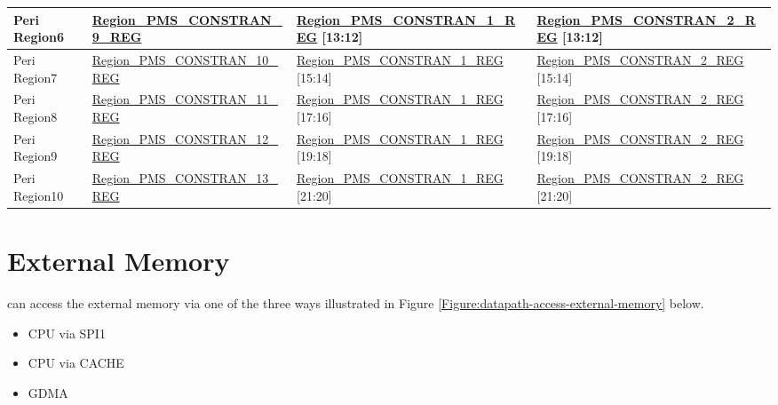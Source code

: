 \documentclass[main\_\_EN.tex]{subfiles}
\begin{document}
\begin{table}[H]
\begin{tabular}{ | l | l | l | l |}
        Peri Region6 & \scriptsize{\hyperref[regdesc:PMSCORE0REGIONPMSCONSTRAIN3REG]{Region\_PMS\_CONSTRAN\_9\_REG}} & \scriptsize{\hyperref[regdesc:PMSCORE0REGIONPMSCONSTRAIN1REG]{Region\_PMS\_CONSTRAN\_1\_REG} [13:12]} & \scriptsize{\hyperref[regdesc:PMSCORE0REGIONPMSCONSTRAIN1REG]{Region\_PMS\_CONSTRAN\_2\_REG} [13:12]}\\\hline
        Peri Region7 & \scriptsize{\hyperref[regdesc:PMSCORE0REGIONPMSCONSTRAIN3REG]{Region\_PMS\_CONSTRAN\_10\_REG}} & \scriptsize{\hyperref[regdesc:PMSCORE0REGIONPMSCONSTRAIN1REG]{Region\_PMS\_CONSTRAN\_1\_REG} [15:14]} & \scriptsize{\hyperref[regdesc:PMSCORE0REGIONPMSCONSTRAIN1REG]{Region\_PMS\_CONSTRAN\_2\_REG} [15:14]}\\\hline
        Peri Region8 & \scriptsize{\hyperref[regdesc:PMSCORE0REGIONPMSCONSTRAIN3REG]{Region\_PMS\_CONSTRAN\_11\_REG}} & \scriptsize{\hyperref[regdesc:PMSCORE0REGIONPMSCONSTRAIN1REG]{Region\_PMS\_CONSTRAN\_1\_REG} [17:16]} & \scriptsize{\hyperref[regdesc:PMSCORE0REGIONPMSCONSTRAIN1REG]{Region\_PMS\_CONSTRAN\_2\_REG} [17:16]}\\\hline
        Peri Region9 & \scriptsize{\hyperref[regdesc:PMSCORE0REGIONPMSCONSTRAIN3REG]{Region\_PMS\_CONSTRAN\_12\_REG}} & \scriptsize{\hyperref[regdesc:PMSCORE0REGIONPMSCONSTRAIN1REG]{Region\_PMS\_CONSTRAN\_1\_REG} [19:18]} & \scriptsize{\hyperref[regdesc:PMSCORE0REGIONPMSCONSTRAIN1REG]{Region\_PMS\_CONSTRAN\_2\_REG} [19:18]}\\\hline
        Peri Region10 & \scriptsize{\hyperref[regdesc:PMSCORE0REGIONPMSCONSTRAIN3REG]{Region\_PMS\_CONSTRAN\_13\_REG}} & \scriptsize{\hyperref[regdesc:PMSCORE0REGIONPMSCONSTRAIN1REG]{Region\_PMS\_CONSTRAN\_1\_REG} [21:20]} & \scriptsize{\hyperref[regdesc:PMSCORE0REGIONPMSCONSTRAIN1REG]{Region\_PMS\_CONSTRAN\_2\_REG} [21:20]}\\\hline
    \end{tabular}
\end{table}


\section{External Memory}

\chipname{} can access the external memory via one of the three ways illustrated in Figure \ref{Figure:datapath-access-external-memory} below.

\begin{itemize}
    \item CPU via SPI1
    \item CPU via CACHE
    \item GDMA

\end{itemize}
\end{document}
